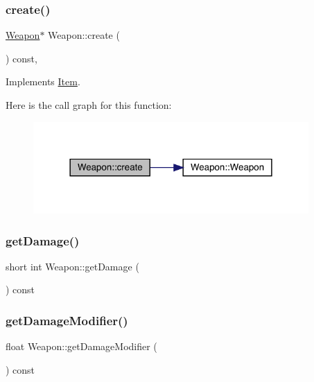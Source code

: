 \subsubsection{\texorpdfstring{create()}{create()}}
{\footnotesize\ttfamily \mbox{\hyperlink{class_weapon}{Weapon}}$\ast$ Weapon\+::create (\begin{DoxyParamCaption}{ }\end{DoxyParamCaption}) const\hspace{0.3cm}{\ttfamily [inline]}, {\ttfamily [virtual]}}



Implements \mbox{\hyperlink{class_item_a17b3fa0cef44ada961e0d3c65e1de864}{Item}}.

Here is the call graph for this function\+:
\nopagebreak
\begin{figure}[H]
\begin{center}
\leavevmode
\includegraphics[width=298pt]{class_weapon_a0755dc1352391eb484644ab4e4cf144d_cgraph}
\end{center}
\end{figure}
\mbox{\label{class_weapon_adb39958d1bfe60371314991040ab04fd}} 
\subsubsection{\texorpdfstring{get\+Damage()}{getDamage()}}
{\footnotesize\ttfamily short int Weapon\+::get\+Damage (\begin{DoxyParamCaption}{ }\end{DoxyParamCaption}) const}

\mbox{\label{class_weapon_aa721632fc6af9548259814f4a4795757}} 
\subsubsection{\texorpdfstring{get\+Damage\+Modifier()}{getDamageModifier()}}
{\footnotesize\ttfamily float Weapon\+::get\+Damage\+Modifier (\begin{DoxyParamCaption}{ }\end{DoxyParamCaption}) const}

